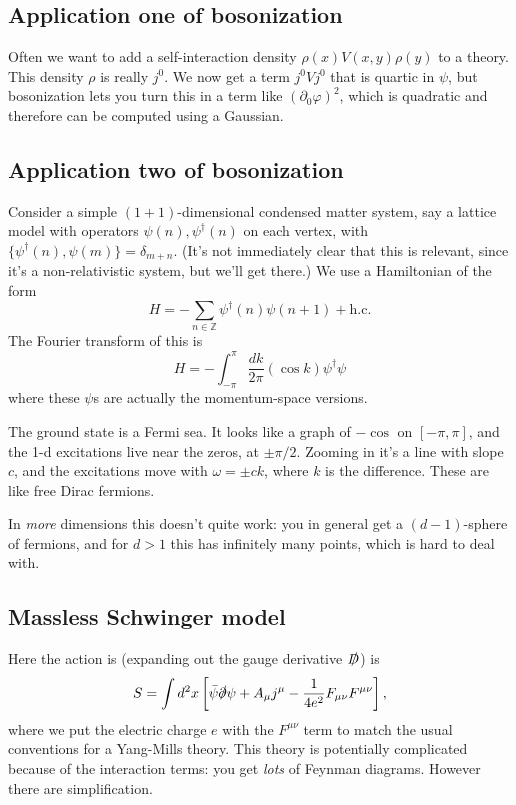 \subsection*{Application one of bosonization}
Often we want to add a self-interaction density $\rho(x) V(x,y) \rho(y)$ to a theory.
This density $\rho$ is really $j^0$.
We now get a term $j^0 V j^0$ that is quartic in $\psi$, but bosonization lets you turn this in a term like $(\partial_0 \varphi)^2$, which is quadratic and therefore can be computed using a Gaussian.

\subsection*{Application two of bosonization}
Consider a simple $(1+1)$-dimensional condensed matter system, say a lattice model with operators $\psi(n), \psi^\dagger(n)$ on each vertex, with $\{ \psi^\dagger(n), \psi(m) \} = \delta_{m+n}$. 
(It's not immediately clear that this is relevant, since it's a non-relativistic system, but we'll get there.)
We use a Hamiltonian of the form
\[
H = - \sum_{n \in \mathbb Z} \psi^\dagger (n) \psi(n+1) + \text{h.c.}
\]
The Fourier transform of this is
\[
H = - \int_{-\pi}^\pi \frac{dk}{2 \pi} (\cos k) \psi^\dagger \psi
\]
where these $\psi$s are actually the momentum-space versions.

The ground state is a Fermi sea.
It looks like a graph of $- \cos$ on $[-\pi, \pi]$, and the 1-d excitations live near the zeros, at $\pm \pi/2$.
Zooming in it's a line with slope $c$, and the excitations move with $\omega = \pm ck$, where $k$ is the difference.
These are like free Dirac fermions.

In \emph{more} dimensions this doesn't quite work: you in general get a $(d-1)$-sphere of fermions, and for $d > 1$ this has infinitely many points, which is hard to deal with.

\subsection*{Massless Schwinger model}
Here the action is (expanding out the gauge derivative $\slashed D$) is
\[
S = \int d^2 x \left[ \bar \psi \slashed \partial \psi + A_\mu j^\mu - \frac{1}{4 e^2} F_{\mu \nu}F^{\mu \nu}\right],
\]
where we put the electric charge $e$ with the $F^{\mu \nu}$ term to match the usual conventions for a Yang-Mills theory.
This theory is potentially complicated because of the interaction terms: you get \emph{lots} of Feynman diagrams.
However there are simplification.

